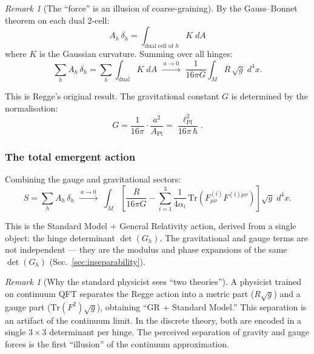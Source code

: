 \documentclass[12pt]{article}
\theoremstyle{remark}
\newtheorem{remark}[theorem]{Remark}
\theoremstyle{definition}
\begin{document}
\begin{remark}[The ``force'' is an illusion of coarse-graining]
By the Gauss--Bonnet theorem on each dual 2-cell:
\begin{equation}
A_h\,\delta_h = \int_{\text{dual cell of }h} K\;dA
\end{equation}
where $K$ is the Gaussian curvature.  Summing over all hinges:
\begin{equation}
\sum_h A_h\,\delta_h = \sum_h\int_{\text{dual}} K\;dA \;\xrightarrow{\;a \to 0\;}\; \frac{1}{16\pi G}\int_M R\,\sqrt{g}\;d^4x.
\end{equation}

This is Regge's original result.  The gravitational constant $G$ is determined by the normalisation:
\begin{equation}
G = \frac{1}{16\pi}\cdot\frac{a^2}{A_\text{Pl}} = \frac{\ell_\text{Pl}^2}{16\pi\,\hbar}.
\end{equation}

\subsubsection{The total emergent action}

Combining the gauge and gravitational sectors:
\begin{equation}
\boxed{S = \sum_h A_h\,\delta_h \;\xrightarrow{\;a \to 0\;}\; \int_M\!\left[\frac{R}{16\pi G} - \sum_{i=1}^{3}\frac{1}{4\alpha_i}\,\text{Tr}(F^{(i)}_{\mu\nu}F^{(i)\mu\nu})\right]\sqrt{g}\;d^4x.}
\end{equation}

This is the Standard Model + General Relativity action, derived from a single object: the hinge determinant $\det(G_h)$.  The gravitational and gauge terms are not independent --- they are the modulus and phase expansions of the same $\det(G_h)$ (Sec.~\ref{sec:inseparability}).

\begin{remark}[Why the standard physicist sees ``two theories'']
A physicist trained on continuum QFT separates the Regge action into a metric part ($R\sqrt{g}$) and a gauge part ($\text{Tr}(F^2)\sqrt{g}$), obtaining ``GR + Standard Model.''  This separation is an artifact of the continuum limit.  In the discrete theory, both are encoded in a single $3 \times 3$ determinant per hinge.  The perceived separation of gravity and gauge forces is the first ``illusion'' of the continuum approximation.
\end{remark}




\end{remark}
\end{document}
